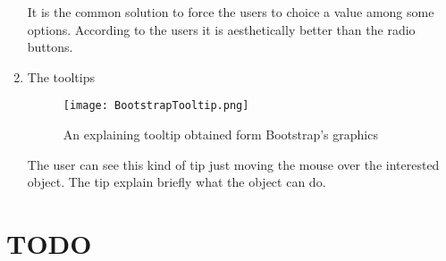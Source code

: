 \begin{enumerate}
It is the common solution to force the users to choice a value among some options. According to the users it is aesthetically better than the radio buttons.

\item The tooltips

\begin{figure}[H]
\centering
\texttt{[image: BootstrapTooltip.png]} 
\caption{An explaining tooltip obtained form Bootstrap's graphics}
\end{figure}

The user can see this kind of tip just moving the mouse over the interested object. The tip explain briefly what the object can do.

\end{enumerate}

\section{TODO}
